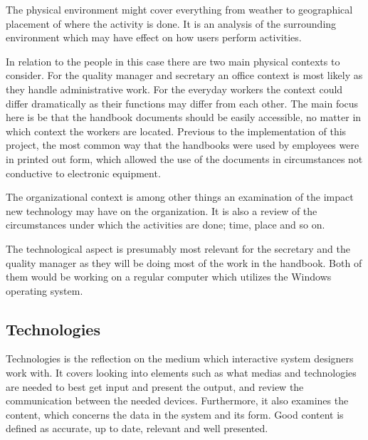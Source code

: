 The physical environment might cover everything from weather to geographical placement of where the activity is done.
It is an analysis of the surrounding environment which may have effect on how users perform activities.
\citep{Benyon}

In relation to the people in this case there are two main physical contexts to consider.
For the quality manager and secretary an office context is most likely as they handle administrative work.
For the everyday workers the context could differ dramatically as their functions may differ from each other.
The main focus here is be that the handbook documents should be easily accessible, no matter in which context the workers are located.
Previous to the implementation of this project, the most common way that the handbooks were used by employees were in printed out form, which allowed the use of the documents in circumstances not conductive to electronic equipment. %



The organizational context is among other things an examination of the impact new technology may have on the organization.
It is also a review of the circumstances under which the activities are done; time, place and so on.
\citep{Benyon}


The technological aspect is presumably most relevant for the secretary and the quality manager as they will be doing most of the work in the handbook.
Both of them would be working on a regular computer which utilizes the Windows operating system. %

\subsection{Technologies}
Technologies is the reflection on the medium which interactive system designers work with.
It covers looking into elements such as what medias and technologies are needed to best get input and present the output, and review the communication between the needed devices.
Furthermore, it also examines the content, which concerns the data in the system and its form.
Good content is defined as accurate, up to date, relevant and well presented.
\citep{Benyon}

